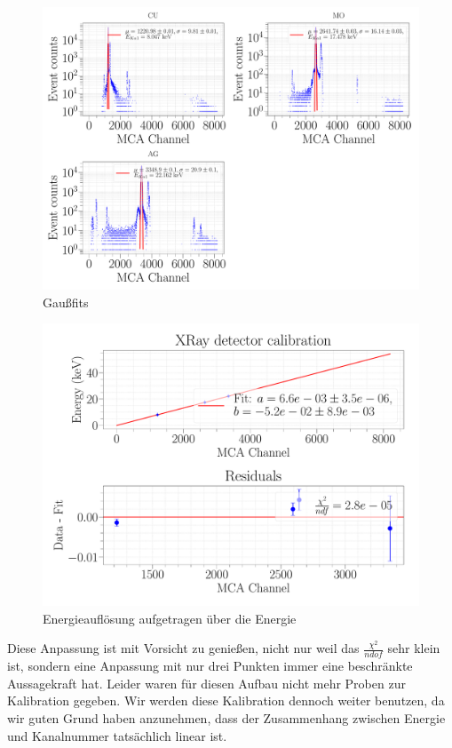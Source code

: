 \documentclass[a4paper,14pt]{article}
\begin{document}
\begin{figure}[H]
\centering
\includegraphics[width=\textwidth]{../Figures/XRay-calibration-samples.pdf}
\caption{Gaußfits}
\label{XRay-calibration-samples}
\end{figure}

\begin{figure}[H]
\centering
\includegraphics[scale=0.25]{../Figures/XRay-calibration-fit.pdf}
\caption{Energieauflösung aufgetragen über die Energie}
\label{XRay_calibration}
\end{figure}

Diese Anpassung ist mit Vorsicht zu genießen, nicht nur weil das $\frac{\chi^2}{ndof}$ sehr klein ist, sondern eine Anpassung mit nur drei Punkten immer eine beschränkte Aussagekraft hat. Leider waren für diesen Aufbau nicht mehr Proben zur Kalibration gegeben. Wir werden diese Kalibration dennoch weiter benutzen, da wir guten Grund haben anzunehmen, dass der Zusammenhang zwischen Energie und Kanalnummer tatsächlich linear ist.
\end{document}
